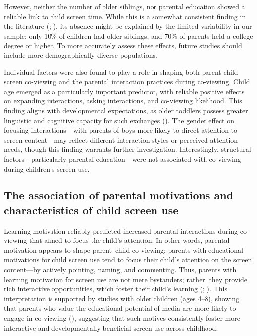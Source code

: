 \documentclass[
  man,
  floatsintext,
  longtable,
  nolmodern,
  notxfonts,
  notimes,
  colorlinks=true,linkcolor=blue,citecolor=blue,urlcolor=blue]{apa7}
\begin{document}
However, neither the number of older siblings, nor parental education
showed a reliable link to child screen time. While this is a somewhat
consistent finding in the literature
(;
), its
absence might be explained by the limited variability in our sample:
only 10\% of children had older siblings, and 70\% of parents held a
college degree or higher. To more accurately assess these effects,
future studies should include more demographically diverse populations.

Individual factors were also found to play a role in shaping both
parent-child screen co-viewing and the parental interaction practices
during co-viewing. Child age emerged as a particularly important
predictor, with reliable positive effects on expanding interactions,
asking interactions, and co-viewing likelihood. This finding aligns with
developmental expectations, as older toddlers possess greater linguistic
and cognitive capacity for such exchanges
(). The gender effect on focusing interactions---with
parents of boys more likely to direct attention to screen content---may
reflect different interaction styles or perceived attention needs,
though this finding warrants further investigation. Interestingly,
structural factors---particularly parental education---were not
associated with co-viewing during children's screen use.

\subsection{The association of parental motivations and characteristics
of child screen
use}\label{the-association-of-parental-motivations-and-characteristics-of-child-screen-use}

Learning motivation reliably predicted increased parental interactions
during co-viewing that aimed to focus the child's attention. In other
words, parental motivation appears to shape parent--child co-viewing:
parents with educational motivations for child screen use tend to focus
their child's attention on the screen content---by actively pointing,
naming, and commenting. Thus, parents with learning motivation for
screen use are not mere bystanders; rather, they provide rich
interactive opportunities, which foster their child's learning
(; ). This interpretation is supported by studies with older
children (ages 4--8), showing that parents who value the educational
potential of media are more likely to engage in co-viewing
(),
suggesting that such motives consistently foster more interactive and
developmentally beneficial screen use across childhood.
\end{document}
